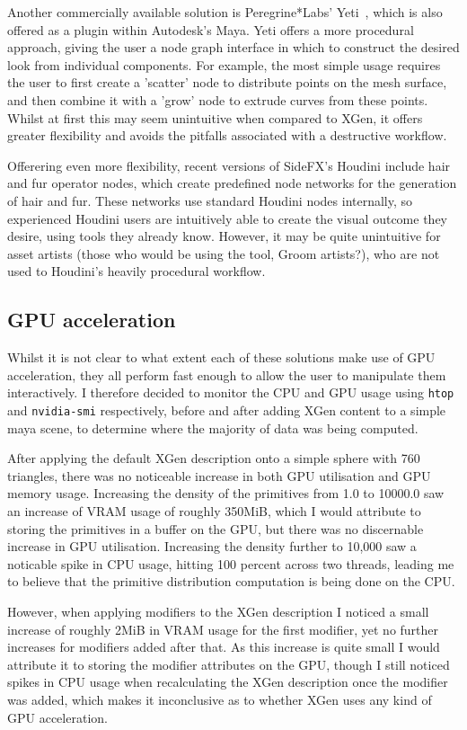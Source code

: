 \documentclass[]{acmsiggraph}
\begin{document}
Another commercially available solution is Peregrine*Labs' Yeti~\cite{yeti}, which is also offered as a plugin within Autodesk's Maya. Yeti offers a more procedural approach, giving the user a node graph interface in which to construct the desired look from individual components. For example, the most simple usage requires the user to first create a 'scatter' node to distribute points on the mesh surface, and then combine it with a 'grow' node to extrude curves from these points. Whilst at first this may seem unintuitive when compared to XGen, it offers greater flexibility and avoids the pitfalls associated with a destructive workflow.

Offerering even more flexibility, recent versions of SideFX's Houdini include hair and fur operator nodes, which create predefined node networks for the generation of hair and fur. These networks use standard Houdini nodes internally, so experienced Houdini users are intuitively able to create the visual outcome they desire, using tools they already know. However, it may be quite unintuitive for asset artists (those who would be using the tool, Groom artists?), who are not used to Houdini's heavily procedural workflow.

\subsection{GPU acceleration} \label{sec:existingGPU}
Whilst it is not clear to what extent each of these solutions make use of GPU acceleration, they all perform fast enough to allow the user to manipulate them interactively. I therefore decided to monitor the CPU and GPU usage using \verb|htop| and \verb|nvidia-smi| respectively, before and after adding XGen content to a simple maya scene, to determine where the majority of data was being computed.

After applying the default XGen description onto a simple sphere with 760 triangles, there was no noticeable increase in both GPU utilisation and GPU memory usage. Increasing the density of the primitives from 1.0 to 10000.0 saw an increase of VRAM usage of roughly 350MiB, which I would attribute to storing the primitives in a buffer on the GPU, but there was no discernable increase in GPU utilisation. Increasing the density further to 10,000 saw a noticable spike in CPU usage, hitting 100 percent across two threads, leading me to believe that the primitive distribution computation is being done on the CPU.

However, when applying modifiers to the XGen description I noticed a small increase of roughly 2MiB in VRAM usage for the first modifier, yet no further increases for modifiers added after that. As this increase is quite small I would attribute it to storing the modifier attributes on the GPU, though I still noticed spikes in CPU usage when recalculating the XGen description once the modifier was added, which makes it inconclusive as to whether XGen uses any kind of GPU acceleration.
\end{document}
